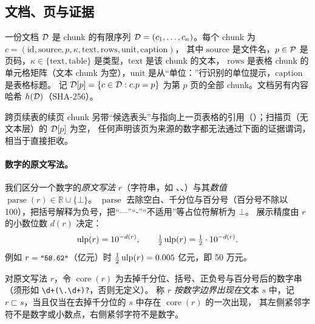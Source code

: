 \subsection{文档、页与证据}
\label{sec:prob-doc}

\begin{definition}
\label{def:prob-doc}
一份文档 $\mathcal{D}$ 是 chunk 的有限序列 $\mathcal{D}=(c_1,\dots,c_n)$。每个 chunk 为
$c=(\text{id},\text{source},p,\kappa,\text{text},\text{rows},\text{unit},\text{caption})$，
其中 $\text{source}$ 是文件名，$p\in\mathcal{P}$ 是页码，$\kappa\in\{\text{text},\text{table}\}$ 是类型，$\text{text}$ 是该 chunk 的文本，
$\text{rows}$ 是表格 chunk 的单元格矩阵（文本 chunk 为空），$\text{unit}$ 是从“单位：”行识别的单位提示，$\text{caption}$ 是表格标题。
记 $\mathcal{D}[p]=\{c\in\mathcal{D} : c.p=p\}$ 为第 $p$ 页的全部 chunk。文档另有内容哈希 $h(\mathcal{D})$（SHA-256）。
\end{definition}

跨页续表的续页 chunk 另带“候选表头”与指向上一页表格的引用（）；扫描页（无文本层）的 $\mathcal{D}[p]$ 为空，
任何声明该页为来源的数字都无法通过下面的证据谓词，相当于直接拒收。

\paragraph{数字的原文写法。}
我们区分一个数字的\emph{原文写法} $r$（字符串，如 、、）与其\emph{数值} $\operatorname{parse}(r)\in\mathbb{R}\cup\{\bot\}$。
$\operatorname{parse}$ 去除空白、千分位与百分号（百分号不除以 100），把括号解释为负号，把“—”“-”“不适用”等占位符解析为 $\bot$。
展示精度由 $r$ 的小数位数 $d(r)$ 决定：
\begin{equation}
\operatorname{ulp}(r) = 10^{-d(r)},\qquad \tfrac12\operatorname{ulp}(r)=\tfrac12\cdot 10^{-d(r)}.
\label{eq:prob-ulp}
\end{equation}
例如 $r=\texttt{\small "58.62"}$（亿元）时 $\tfrac12\operatorname{ulp}(r)=0.005$ 亿元，即 50 万元。

\begin{definition}[数字边界匹配]
\label{def:prob-match}
对原文写法 $r$，令 $\operatorname{core}(r)$ 为去掉千分位、括号、正负号与百分号后的数字串（须形如 \texttt{\textbackslash d+(\textbackslash .\textbackslash d+)?}，否则无定义）。
称 $r$ \emph{按数字边界出现在}文本 $s$ 中，记 $r\sqsubset s$，当且仅当在去掉千分位的 $s$ 中存在 $\operatorname{core}(r)$ 的一次出现，
其左侧紧邻字符不是数字或小数点，右侧紧邻字符不是数字。
\end{definition}

